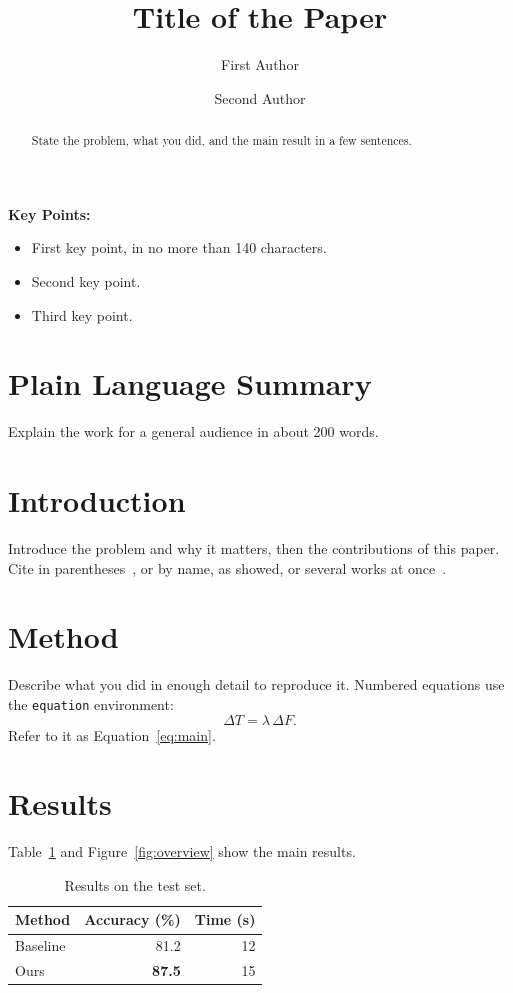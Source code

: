 \documentclass[11pt,a4paper]{article}
\title{Title of the Paper}
\author[1]{First Author}
\author[2]{Second Author}
\affil[1]{Department of Earth and Environmental Sciences, University, City, Country}
\affil[2]{Institute, City, Country}
\date{}
\begin{document}
\maketitle

\noindent\textbf{Key Points:}
\begin{itemize}
\item First key point, in no more than 140 characters.
\item Second key point.
\item Third key point.
\end{itemize}

\begin{abstract}
State the problem, what you did, and the main result in a few sentences.
\end{abstract}

\section*{Plain Language Summary}
Explain the work for a general audience in about 200 words.

\section{Introduction}
\label{sec:intro}
Introduce the problem and why it matters, then the contributions of this
paper. Cite in parentheses~\citep{manabe1967}, or by name, as \citet{lorenz1963} showed, or several works at
once~\citep{manabe1967,lorenz1963}.

\section{Method}
\label{sec:method}
Describe what you did in enough detail to reproduce it. Numbered equations use
the \texttt{equation} environment:
\begin{equation}
  \label{eq:main}
  \Delta T = \lambda\, \Delta F.
\end{equation}
Refer to it as Equation~\eqref{eq:main}.

\section{Results}
\label{sec:results}
Table~\ref{tab:results} and Figure~\ref{fig:overview} show the main results.

\begin{table}[htbp]
  \centering
  \caption{Results on the test set.}
  \label{tab:results}
  \begin{tabular}{lrr}
    \toprule
    Method & Accuracy (\%) & Time (s) \\
    \midrule
    Baseline & 81.2 & 12 \\
    Ours & \textbf{87.5} & 15 \\
    \bottomrule
  \end{tabular}
\end{table}
\end{document}
